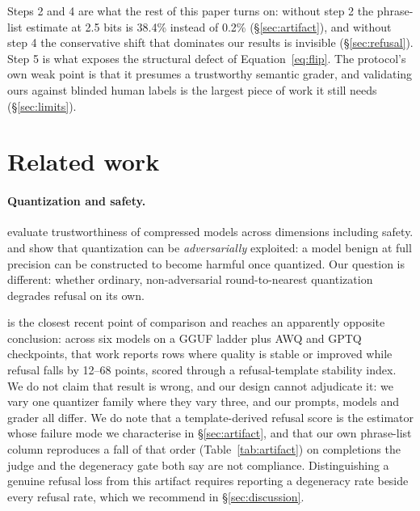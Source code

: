 \documentclass[11pt,a4paper]{article}
\begin{document}
Steps 2 and 4 are what the rest of this paper turns on: without step 2 the
phrase-list estimate at 2.5 bits is 38.4\% instead of 0.2\%
(\S\ref{sec:artifact}), and without step 4 the conservative shift that dominates
our results is invisible (\S\ref{sec:refusal}). Step 5 is what exposes the
structural defect of Equation~\ref{eq:flip}. The protocol's own weak point is
that it presumes a trustworthy semantic grader, and validating ours against
blinded human labels is the largest piece of work it still needs
(\S\ref{sec:limits}).

\section{Related work}

\paragraph{Quantization and safety.} \citet{hong2024trust} evaluate
trustworthiness of compressed models across dimensions including safety.
\citet{egashira2024exploiting} and \citet{egashira2025gguf} show that
quantization can be \emph{adversarially} exploited: a model benign at full
precision can be constructed to become harmful once quantized. Our question is
different: whether ordinary, non-adversarial round-to-nearest quantization
degrades refusal on its own.

\citet{kadadekar2026quality} is the closest recent point of comparison and
reaches an apparently opposite conclusion: across six models on a GGUF ladder
plus AWQ and GPTQ checkpoints, that work reports rows where quality is stable or
improved while refusal falls by 12--68 points, scored through a refusal-template
stability index. We do not claim that result is wrong, and our design cannot
adjudicate it: we vary one quantizer family where they vary three, and our
prompts, models and grader all differ. We do note that a template-derived refusal
score is the estimator whose failure mode we characterise in
\S\ref{sec:artifact}, and that our own phrase-list column reproduces a fall of
that order (Table~\ref{tab:artifact}) on completions the judge and the degeneracy
gate both say are not compliance. Distinguishing a genuine refusal loss from this
artifact requires reporting a degeneracy rate beside every refusal rate, which we
recommend in \S\ref{sec:discussion}.
\end{document}
